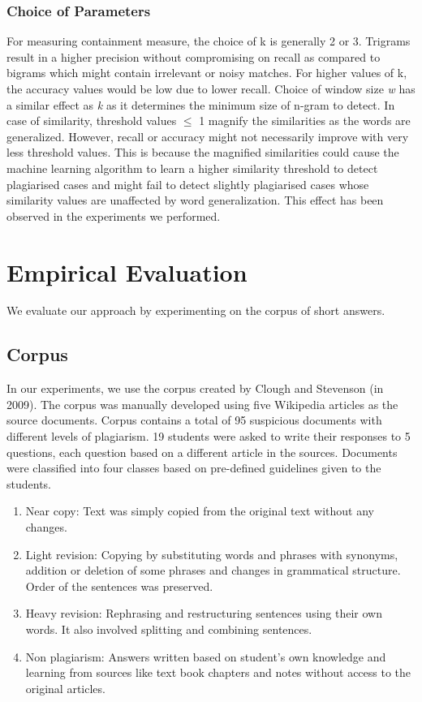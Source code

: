 \documentclass[11pt]{article}
\begin{document}
\subsubsection*{Choice of Parameters}  For measuring containment measure, the choice of k is generally 2 or 3. Trigrams result in a higher precision without compromising on recall as compared to bigrams which might contain irrelevant or noisy matches. For higher values of k, the accuracy values would be low due to lower recall. Choice of window size {\em  w} has a similar effect as {\em k} as it determines the minimum size of n-gram to detect. In case of similarity, threshold values $\le$ 1 magnify the similarities as the words are generalized. However, recall or accuracy might not necessarily improve with  very less threshold values. This is because the magnified similarities could cause the machine learning algorithm to learn a higher similarity threshold to detect plagiarised cases and might fail to detect slightly plagiarised cases whose similarity values are unaffected by word generalization. This effect has been observed in the experiments we performed.

\section{Empirical Evaluation}\label{4}
We evaluate our approach by experimenting on the corpus of short answers.
\subsection{Corpus}
In our experiments, we use the corpus created by Clough and Stevenson (in 2009). The corpus was manually developed using five Wikipedia articles as the source documents. Corpus contains a total of 95 suspicious documents with different levels of plagiarism. 19 students were asked to write their responses to 5 questions, each question based on a different article in the sources. Documents were classified into four classes based on pre-defined guidelines given to the students.
 \begin{enumerate}
 \itemsep0em
 \item Near copy: Text was simply copied from the original text without any changes.
 \item Light revision: Copying by substituting words and phrases with synonyms, addition or deletion of some phrases and changes in grammatical structure. Order of the sentences was preserved.
 \item Heavy revision: Rephrasing and restructuring  sentences using their own words. It also involved splitting and combining sentences.
 \item Non plagiarism: Answers written based on student's own knowledge and learning from sources like text book chapters and notes without access to the original articles.
 \end{enumerate}
 
\end{document}
